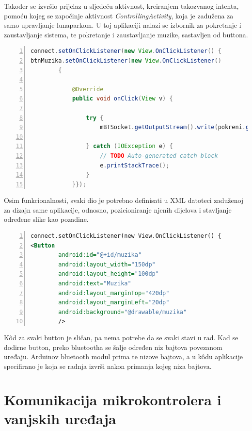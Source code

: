 Također se izvršio prijelaz u sljedeću aktivnost, kreiranjem takozvanog intenta, pomoću kojeg se započinje aktivnost \textit{ControllingActivity}, koja je zadužena za samo upravljanje lunaparkom. U toj aplikaciji nalazi se izbornik za pokretanje i zaustavljanje sistema, te pokretanje i zaustavljanje muzike, sastavljen od buttona. 

\begin{lstlisting}[frame=single,language=Java,numbers=left, numberstyle=\tiny, xleftmargin=0.05\textwidth, xrightmargin=0.05\textwidth, basicstyle=\ttfamily\footnotesize]
connect.setOnClickListener(new View.OnClickListener() {
btnMuzika.setOnClickListener(new View.OnClickListener()
        {

            @Override
            public void onClick(View v) {

                try {
                    mBTSocket.getOutputStream().write(pokreni.getBytes());

                } catch (IOException e) {
                    // TODO Auto-generated catch block
                    e.printStackTrace();
                }
            }});
            \end{lstlisting}
            
Osim funkcionalnosti, svaki dio je potrebno definisati u XML datoteci zaduženoj za dizajn same aplikacije, odnosno, pozicioniranje njenih dijelova i stavljanje određene slike kao pozadine.
\begin{lstlisting}[frame=single,language=XML,numbers=left, numberstyle=\tiny, xleftmargin=0.05\textwidth, xrightmargin=0.05\textwidth, basicstyle=\ttfamily\footnotesize]
connect.setOnClickListener(new View.OnClickListener() {
<Button
        android:id="@+id/muzika"
        android:layout_width="150dp"
        android:layout_height="100dp"
        android:text="Muzika"
        android:layout_marginTop="420dp"
        android:layout_marginLeft="20dp"
        android:background="@drawable/muzika"
        />
   \end{lstlisting}         
Kôd za svaki button je sličan, pa nema potrebe da se svaki stavi u rad. Kad se dodirne button, preko bluetootha se šalje određen niz bajtova povezanom uređaju. Arduinov bluetooth modul prima te nizove bajtova, a u kôdu aplikacije specifirano je koja se radnja izvrši nakon primanja kojeg niza bajtova.

\section{Komunikacija mikrokontrolera i vanjskih uređaja}

